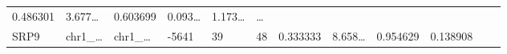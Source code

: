 \documentclass[
]{article}
\begin{document}
\begin{longtable}[]{@{}llllllllllll@{}}
\begin{minipage}[t]{0.06\columnwidth}
0.486301\strut
\end{minipage} & \begin{minipage}[t]{0.08\columnwidth}\raggedright
3.677\ldots{}\strut
\end{minipage} & \begin{minipage}[t]{0.06\columnwidth}\raggedright
0.603699\strut
\end{minipage} & \begin{minipage}[t]{0.06\columnwidth}\raggedright
0.093\ldots{}\strut
\end{minipage} & \begin{minipage}[t]{0.09\columnwidth}\raggedright
1.173\ldots{}\strut
\end{minipage} & \begin{minipage}[t]{0.02\columnwidth}\raggedright
\ldots{}\strut
\end{minipage}\tabularnewline
\begin{minipage}[t]{0.06\columnwidth}\raggedright
SRP9\strut
\end{minipage} & \begin{minipage}[t]{0.06\columnwidth}\raggedright
chr1\_\ldots{}\strut
\end{minipage} & \begin{minipage}[t]{0.06\columnwidth}\raggedright
chr1\_\ldots{}\strut
\end{minipage} & \begin{minipage}[t]{0.06\columnwidth}\raggedright
-5641\strut
\end{minipage} & \begin{minipage}[t]{0.06\columnwidth}\raggedright
39\strut
\end{minipage} & \begin{minipage}[t]{0.06\columnwidth}\raggedright
48\strut
\end{minipage} & \begin{minipage}[t]{0.06\columnwidth}\raggedright
0.333333\strut
\end{minipage} & \begin{minipage}[t]{0.08\columnwidth}\raggedright
8.658\ldots{}\strut
\end{minipage} & \begin{minipage}[t]{0.06\columnwidth}\raggedright
0.954629\strut
\end{minipage} & \begin{minipage}[t]{0.06\columnwidth}\raggedright
0.138908\strut
\end{minipage} & \begin{minipage}[t]{0.09\columnwidth}\raggedright

\end{minipage}
\end{longtable}
\end{document}
